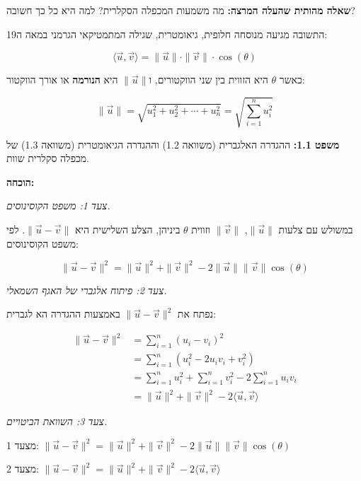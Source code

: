\textbf{שאלה מהותית שהעלה המרצה:} מה משמעות המכפלה הסקלרית? למה היא כל כך חשובה?

התשובה מגיעה מנוסחה חלופית, גיאומטרית, שגילה המתמטיקאי הגרמני  במאה ה\en{-}\num{19}:

\begin{equation}
\langle \vec{u}, \vec{v} \rangle = \|\vec{u}\| \cdot \|\vec{v}\| \cdot \cos(\theta)
\end{equation}

כאשר $\theta$ היא הזווית בין שני הווקטורים, ו\en{-}$\|\vec{u}\|$ היא \textbf{הנורמה}  או אורך הווקטור:

\begin{equation}
\|\vec{u}\| = \sqrt{u_1^2 + u_2^2 + \cdots + u_n^2} = \sqrt{\sum_{i=1}^{n} u_i^2}
\end{equation}


\textbf{משפט \num{1.1}:} ההגדרה האלגברית (משוואה \num{1.2}) וההגדרה הגיאומטרית (משוואה \num{1.3}) של מכפלה סקלרית שוות.

\textbf{הוכחה:}

\textit{צעד 1: משפט הקוסינוסים.}

במשולש עם צלעות $\|\vec{u}\|$, $\|\vec{v}\|$ וזווית $\theta$ ביניהן, הצלע השלישית היא $\|\vec{u} - \vec{v}\|$. לפי משפט הקוסינוסים:

\[
\|\vec{u} - \vec{v}\|^2 = \|\vec{u}\|^2 + \|\vec{v}\|^2 - \num{2}\|\vec{u}\|\|\vec{v}\|\cos(\theta)
\]

\textit{צעד 2: פיתוח אלגברי של האגף השמאלי.}

נפתח את $\|\vec{u} - \vec{v}\|^2$ באמצעות ההגדרה הא לגברית:

\begin{align}
\|\vec{u} - \vec{v}\|^2 &= \sum_{i=1}^{n}(u_i - v_i)^2 \nonumber \\
&= \sum_{i=1}^{n}(u_i^2 - \num{2}u_i v_i + v_i^2) \nonumber \\
&= \sum_{i=1}^{n} u_i^2 + \sum_{i=1}^{n} v_i^2 - \num{2}\sum_{i=1}^{n} u_i v_i \nonumber \\
&= \|\vec{u}\|^2 + \|\vec{v}\|^2 - \num{2}\langle \vec{u}, \vec{v} \rangle
\end{align}

\textit{צעד 3: השוואת הביטויים.}

מצעד \num{1}: $\|\vec{u} - \vec{v}\|^2 = \|\vec{u}\|^2 + \|\vec{v}\|^2 - \num{2}\|\vec{u}\|\|\vec{v}\|\cos(\theta)$

מצעד \num{2}: $\|\vec{u} - \vec{v}\|^2 = \|\vec{u}\|^2 + \|\vec{v}\|^2 - \num{2}\langle \vec{u}, \vec{v} \rangle$

